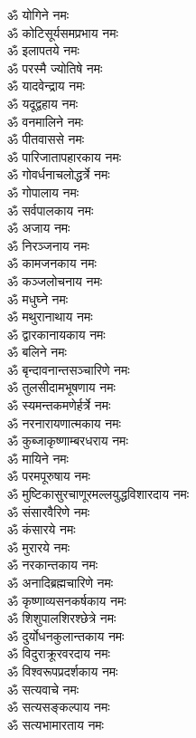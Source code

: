 \begin{multicols}{2}
\begin{flushleft}
ॐ योगिने नमः\\
ॐ कोटिसूर्यसमप्रभाय नमः\hfill{}\\
ॐ इलापतये नमः\\
ॐ परस्मै ज्योतिषे नमः\\
ॐ यादवेन्द्राय नमः\\
ॐ यदूद्वहाय नमः\\
ॐ वनमालिने नमः\\
ॐ पीतवाससे नमः\\
ॐ पारिजातापहारकाय नमः\\
ॐ गोवर्धनाचलोद्धर्त्रे नमः\\
ॐ गोपालाय नमः\\
ॐ सर्वपालकाय नमः\hfill{}\\
ॐ अजाय नमः\\
ॐ निरञ्जनाय नमः\\
ॐ कामजनकाय नमः\\
ॐ कञ्जलोचनाय नमः\\
ॐ मधुघ्ने नमः\\
ॐ मथुरानाथाय नमः\\
ॐ द्वारकानायकाय नमः\\
ॐ बलिने नमः\\
ॐ बृन्दावनान्तसञ्चारिणे नमः\\
ॐ तुलसीदामभूषणाय नमः\hfill{}\\
ॐ स्यमन्तकमणेर्हर्त्रे नमः\\
ॐ नरनारायणात्मकाय नमः\\
ॐ कुब्जाकृष्णाम्बरधराय नमः\\
ॐ मायिने नमः\\
ॐ परमपूरुषाय नमः\\
ॐ मुष्टिकासुरचाणूर\-मल्लयुद्ध\-विशारदाय नमः\\
ॐ संसारवैरिणे नमः\\
ॐ कंसारये नमः\\
ॐ मुरारये नमः\\
ॐ नरकान्तकाय नमः\hfill{}\\
ॐ अनादिब्रह्मचारिणे नमः\\
ॐ कृष्णाव्यसनकर्षकाय नमः\\
ॐ शिशुपालशिरश्छेत्रे नमः\\
ॐ दुर्योधनकुलान्तकाय नमः\\
ॐ विदुराक्रूरवरदाय नमः\\
ॐ विश्वरूपप्रदर्शकाय नमः\\
ॐ सत्यवाचे नमः\\
ॐ सत्यसङ्कल्पाय नमः\\
ॐ सत्यभामारताय नमः\\

\end{flushleft}
\end{multicols}
